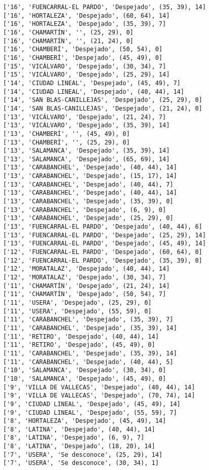 \documentclass[11pt]{article}
\begin{document}
\begin{Verbatim}[commandchars=\\\{\}]
['16', 'FUENCARRAL-EL PARDO', 'Despejado', (35, 39), 14]
['16', 'HORTALEZA', 'Despejado', (60, 64), 14]
['16', 'HORTALEZA', 'Despejado', (35, 39), 7]
['16', 'CHAMARTÍN', '', (25, 29), 0]
['16', 'CHAMARTÍN', '', (21, 24), 0]
['16', 'CHAMBERÍ', 'Despejado', (50, 54), 0]
['16', 'CHAMBERÍ', 'Despejado', (45, 49), 0]
['15', 'VICÁLVARO', 'Despejado', (30, 34), 7]
['15', 'VICÁLVARO', 'Despejado', (25, 29), 14]
['14', 'CIUDAD LINEAL', 'Despejado', (45, 49), 7]
['14', 'CIUDAD LINEAL', 'Despejado', (40, 44), 14]
['14', 'SAN BLAS-CANILLEJAS', 'Despejado', (25, 29), 0]
['14', 'SAN BLAS-CANILLEJAS', 'Despejado', (21, 24), 0]
['13', 'VICÁLVARO', 'Despejado', (21, 24), 7]
['13', 'VICÁLVARO', 'Despejado', (35, 39), 14]
['13', 'CHAMBERÍ', '', (45, 49), 0]
['13', 'CHAMBERÍ', '', (25, 29), 0]
['13', 'SALAMANCA', 'Despejado', (35, 39), 14]
['13', 'SALAMANCA', 'Despejado', (65, 69), 14]
['13', 'CARABANCHEL', 'Despejado', (40, 44), 14]
['13', 'CARABANCHEL', 'Despejado', (15, 17), 14]
['13', 'CARABANCHEL', 'Despejado', (40, 44), 7]
['13', 'CARABANCHEL', 'Despejado', (40, 44), 14]
['13', 'CARABANCHEL', 'Despejado', (35, 39), 0]
['13', 'CARABANCHEL', 'Despejado', (6, 9), 0]
['13', 'CARABANCHEL', 'Despejado', (25, 29), 0]
['13', 'FUENCARRAL-EL PARDO', 'Despejado', (40, 44), 6]
['13', 'FUENCARRAL-EL PARDO', 'Despejado', (25, 29), 14]
['13', 'FUENCARRAL-EL PARDO', 'Despejado', (45, 49), 14]
['12', 'FUENCARRAL-EL PARDO', 'Despejado', (60, 64), 0]
['12', 'FUENCARRAL-EL PARDO', 'Despejado', (35, 39), 0]
['12', 'MORATALAZ', 'Despejado', (40, 44), 14]
['12', 'MORATALAZ', 'Despejado', (30, 34), 7]
['11', 'CHAMARTÍN', 'Despejado', (21, 24), 14]
['11', 'CHAMARTÍN', 'Despejado', (50, 54), 7]
['11', 'USERA', 'Despejado', (25, 29), 0]
['11', 'USERA', 'Despejado', (55, 59), 0]
['11', 'CARABANCHEL', 'Despejado', (35, 39), 7]
['11', 'CARABANCHEL', 'Despejado', (35, 39), 14]
['11', 'RETIRO', 'Despejado', (40, 44), 14]
['11', 'RETIRO', 'Despejado', (45, 49), 0]
['11', 'CARABANCHEL', 'Despejado', (35, 39), 14]
['11', 'CARABANCHEL', 'Despejado', (40, 44), 5]
['10', 'SALAMANCA', 'Despejado', (30, 34), 0]
['10', 'SALAMANCA', 'Despejado', (45, 49), 0]
['9', 'VILLA DE VALLECAS', 'Despejado', (40, 44), 14]
['9', 'VILLA DE VALLECAS', 'Despejado', (70, 74), 14]
['9', 'CIUDAD LINEAL', 'Despejado', (45, 49), 14]
['9', 'CIUDAD LINEAL', 'Despejado', (55, 59), 7]
['8', 'HORTALEZA', 'Despejado', (45, 49), 14]
['8', 'LATINA', 'Despejado', (40, 44), 14]
['8', 'LATINA', 'Despejado', (6, 9), 7]
['8', 'LATINA', 'Despejado', (18, 20), 14]
['7', 'USERA', 'Se desconoce', (25, 29), 14]
['7', 'USERA', 'Se desconoce', (30, 34), 1]

\end{Verbatim}
\end{document}
